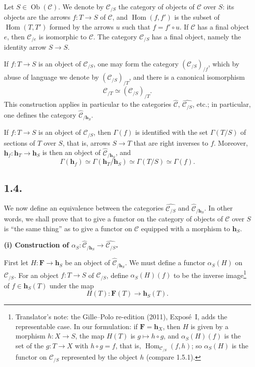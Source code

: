 Let \(S\in\operatorname{Ob}(\mathscr C)\). We denote by
\(\mathscr C_{/S}\) the category of objects of \(\mathscr C\) over \(S\):
its objects are the arrows \(f:T\to S\) of \(\mathscr C\), and
\(\operatorname{Hom}(f,f')\) is the subset of
\(\operatorname{Hom}(T,T')\) formed by the arrows \(u\) such that
\(f=f'\circ u\). If \(\mathscr C\) has a final object \(e\), then
\(\mathscr C_{/e}\) is isomorphic to \(\mathscr C\). The category
\(\mathscr C_{/S}\) has a final object, namely the identity arrow
\(S\to S\).

If \(f:T\to S\) is an object of \(\mathscr C_{/S}\), one may form the
category \((\mathscr C_{/S})_{/f}\), which by abuse of language we denote by
\((\mathscr C_{/S})_{/T}\), and there is a canonical isomorphism
\[
  \mathscr C_{/T}\simeq(\mathscr C_{/S})_{/T}.
\]
This construction applies in particular to the categories
\(\widehat{\mathscr C}\), \(\widehat{\mathscr C_{/S}}\), etc.; in particular,
one defines the category \(\widehat{\mathscr C}_{/\mathbf h_S}\).

If \(f:T\to S\) is an object of \(\mathscr C_{/S}\), then \(\Gamma(f)\)
is identified with the set \(\Gamma(T/S)\) of sections of \(T\) over \(S\),
that is, arrows \(S\to T\) that are right inverses to \(f\). Moreover,
\(\mathbf h_f:\mathbf h_T\to\mathbf h_S\) is then an object of
\(\widehat{\mathscr C}_{/\mathbf h_S}\), and
\[
  \Gamma(\mathbf h_f)
    \simeq\Gamma(\mathbf h_T/\mathbf h_S)
    \simeq\Gamma(T/S)
    \simeq\Gamma(f).
\]

\subsection*{1.4.}

We now define an equivalence between the categories
\(\widehat{\mathscr C_{/S}}\) and
\(\widehat{\mathscr C}_{/\mathbf h_S}\). In other words, we shall prove that
to give a functor on the category of objects of \(\mathscr C\) over \(S\) is
``the same thing'' as to give a functor on \(\mathscr C\) equipped with a
morphism to \(\mathbf h_S\).

\medskip
\noindent\textbf{(i) Construction of
\(\alpha_S:\widehat{\mathscr C}_{/\mathbf h_S}
\to\widehat{\mathscr C_{/S}}\).}

First let \(H:\mathbf F\to\mathbf h_S\) be an object of
\(\widehat{\mathscr C}_{/\mathbf h_S}\). We must define a functor
\(\alpha_S(H)\) on \(\mathscr C_{/S}\). For an object
\(f:T\to S\) of \(\mathscr C_{/S}\), define \(\alpha_S(H)(f)\) to be the
inverse image\footnote{Translator's note: the Gille--Polo re-edition (2011), Exposé~I, adds the
representable case. In our formulation: if \(\mathbf F=\mathbf h_X\), then
\(H\) is given by a morphism \(h:X\to S\), the map \(H(T)\) is
\(g\mapsto h\circ g\), and \(\alpha_S(H)(f)\) is the set of the \(g:T\to X\)
with \(h\circ g=f\), that is, \(\operatorname{Hom}_{\mathscr C_{/S}}(f,h)\);
so \(\alpha_S(H)\) is the functor on \(\mathscr C_{/S}\) represented by the
object \(h\) (compare 1.5.1).} of \(f\in\mathbf h_S(T)\) under the map
\[
  H(T):\mathbf F(T)\longrightarrow\mathbf h_S(T).
\]

